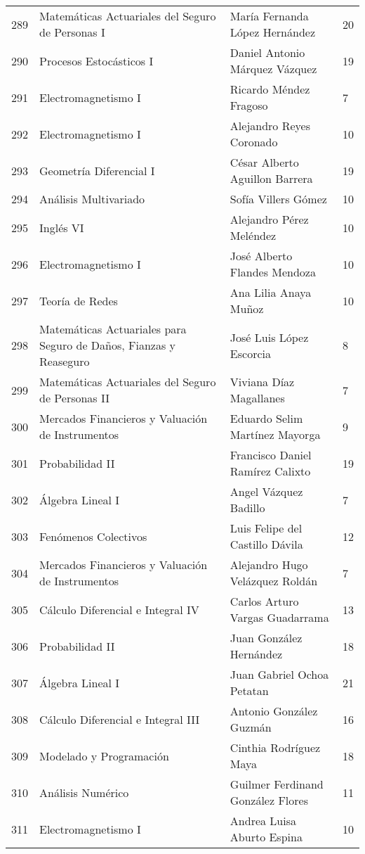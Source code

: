 \begin{table}[ht]
\begin{tabular}{rlll}
  289 & Matemáticas Actuariales del Seguro de Personas I & María Fernanda López Hernández & 20 \\ 
  290 & Procesos Estocásticos I & Daniel Antonio Márquez Vázquez & 19 \\ 
  291 & Electromagnetismo I & Ricardo Méndez Fragoso & 7 \\ 
  292 & Electromagnetismo I & Alejandro Reyes Coronado & 10 \\ 
  293 & Geometría Diferencial I & César Alberto Aguillon Barrera & 19 \\ 
  294 & Análisis Multivariado & Sofía Villers Gómez & 10 \\ 
  295 & Inglés VI & Alejandro Pérez Meléndez & 10 \\ 
  296 & Electromagnetismo I & José Alberto Flandes Mendoza & 10 \\ 
  297 & Teoría de Redes & Ana Lilia Anaya Muñoz & 10 \\ 
  298 & Matemáticas Actuariales para Seguro de Daños, Fianzas y Reaseguro & José Luis López Escorcia & 8 \\ 
  299 & Matemáticas Actuariales del Seguro de Personas II & Viviana Díaz Magallanes & 7 \\ 
  300 & Mercados Financieros y Valuación de Instrumentos & Eduardo Selim Martínez Mayorga & 9 \\ 
  301 & Probabilidad II & Francisco Daniel Ramírez Calixto & 19 \\ 
  302 & Álgebra Lineal I & Angel Vázquez Badillo & 7 \\ 
  303 & Fenómenos Colectivos & Luis Felipe del Castillo Dávila & 12 \\ 
  304 & Mercados Financieros y Valuación de Instrumentos & Alejandro Hugo Velázquez Roldán & 7 \\ 
  305 & Cálculo Diferencial e Integral IV & Carlos Arturo Vargas Guadarrama & 13 \\ 
  306 & Probabilidad II & Juan González Hernández & 18 \\ 
  307 & Álgebra Lineal I & Juan Gabriel Ochoa Petatan & 21 \\ 
  308 & Cálculo Diferencial e Integral III & Antonio González Guzmán & 16 \\ 
  309 & Modelado y Programación & Cinthia Rodríguez Maya & 18 \\ 
  310 & Análisis Numérico & Guilmer Ferdinand González Flores & 11 \\ 
  311 & Electromagnetismo I & Andrea Luisa Aburto Espina & 10 \\ 

\end{tabular}
\end{table}
